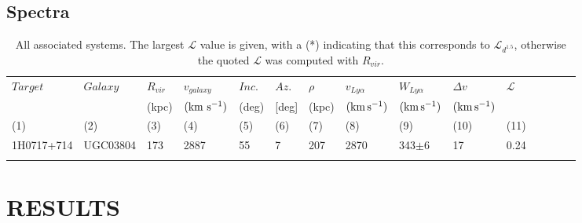 \documentclass[iop]{emulateapj-rtx4}
\begin{document}
\subsection{Spectra}

\begin{table}[ht]\footnotesize
\begin{center}
\begin{tabular}{l l l l l l l l l l l l l l l}
 \hline \hline
  $Target$	&  $Galaxy$  & $R_{vir}$        & $v_{galaxy}$ 	   	  &  $Inc.$               &  $Az.$ 	       & $\rho$		   & $v_{Ly\alpha}$	 	  	& $W_{Ly\alpha}$  & $\Delta v$  			 & $\mathcal{L}$ \\ 
  	  	&       & \scriptsize (kpc) & \scriptsize  $\rm (km ~s^{-1})$ & \scriptsize (deg) & \scriptsize [deg] & \scriptsize (kpc) & \scriptsize  $\rm (km\, s^{-1})$ & \scriptsize $\rm (km\, s^{-1})$ & \scriptsize  $\rm (km\, s^{-1})$ &  \\
 \scriptsize (1) & \scriptsize (2) & \scriptsize (3)    & \scriptsize (4)     & \scriptsize (5)    & \scriptsize (6)   & \scriptsize  (7)   & \scriptsize (8) & \scriptsize (9) & \scriptsize (10) & \scriptsize (11) \\ \hline \hline

1H0717+714  &  UGC03804  &  173  &  2887  &  55  &  7  &  207  &  2870  &  343$\pm$6  &  17  &  0.24  \\


 \\
\hline
\end{tabular}
\end{center}
  \caption{\small{All associated systems. The largest $\mathcal{L}$ value is given, with a (\**) indicating that this corresponds to $\mathcal{L}_{d^{1.5}}$, otherwise the quoted $\mathcal{L}$ was computed with $R_{vir}$.}}
  \label{target_table}
\end{table}


\section{RESULTS}


\end{document}
